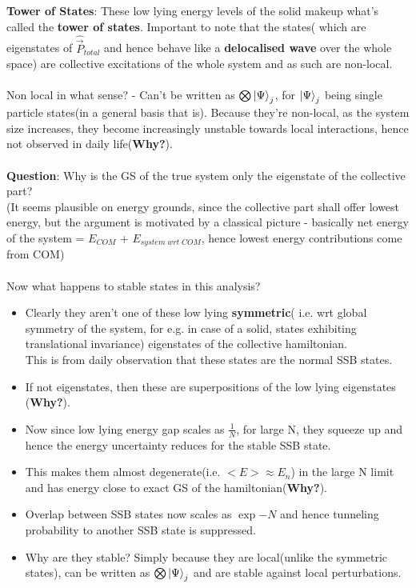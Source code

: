 \documentclass[12pt]{article}
\begin{document}
\textbf{Tower of States}: 
These low lying energy levels of the solid makeup what's called the \textbf{tower of states}.
Important to note that the states( which are eigenstates of $\hat{\Vec{P}}_{total}$ and hence behave like a \textbf{delocalised wave} over the whole space) are collective excitations of the whole system and as such are non-local.\\
\\
Non local in what sense? - Can't be written as $\bigotimes \ket{\Psi}_j$, for $\ket{\Psi}_j$ being single particle states(in a general basis that is).
Because they're non-local, as the system size increases, they become increasingly unstable towards local interactions, hence not observed in daily life(\textbf{Why?}).\\
\\
\textbf{Question}: Why is the GS of the true system only the eigenstate of the collective part?\\
(It seems plausible on energy grounds, since the collective part shall offer lowest energy, but the argument is motivated by a classical picture - basically net energy of the system = $E_{COM}$ + $E_{system\;wrt\;COM}$, hence lowest energy contributions come from COM)\\
\\
Now what happens to stable states in this analysis?
\begin{itemize}
    \item Clearly they aren't one of these low lying\textbf{ symmetric}( i.e. wrt global symmetry of the system, for e.g. in case of a solid, states exhibiting translational invariance) eigenstates of the collective hamiltonian.\\
    This is from daily observation that these states are the normal SSB states.
    \item If not eigenstates, then these are superpositions of the low lying eigenstates (\textbf{Why?}).
    \item Now since low lying energy gap scales as $\displaystyle{\frac{1}{N}}$, for large N, they squeeze up and hence the energy uncertainty reduces for the stable SSB state.
    \item This makes them almost degenerate(i.e. $<E> \approx E_n$) in the large N limit and has energy close to exact GS of the hamiltonian(\textbf{Why?}).
    \item Overlap between SSB states now scales as $\exp{-N}$ and hence tunneling probability to another SSB state is suppressed.
    
    
    \item Why are they stable? Simply because they are local(unlike the symmetric states), can be written as  $\bigotimes \ket{\Psi}_j$ and are stable against local perturbations. 
   
\end{itemize}
\end{document}
